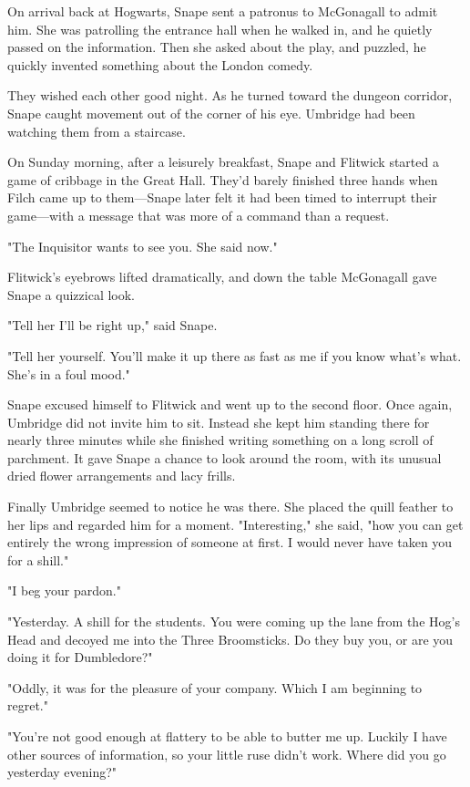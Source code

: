 On arrival back at Hogwarts, Snape sent a patronus to McGonagall to admit him. She was patrolling the entrance hall when he walked in, and he quietly passed on the information. Then she asked about the play, and puzzled, he quickly invented something about the London comedy.

They wished each other good night. As he turned toward the dungeon corridor, Snape caught movement out of the corner of his eye. Umbridge had been watching them from a staircase.

On Sunday morning, after a leisurely breakfast, Snape and Flitwick started a game of cribbage in the Great Hall. They'd barely finished three hands when Filch came up to them—Snape later felt it had been timed to interrupt their game—with a message that was more of a command than a request.

"The Inquisitor wants to see you. She said now."

Flitwick's eyebrows lifted dramatically, and down the table McGonagall gave Snape a quizzical look.

"Tell her I'll be right up," said Snape.

"Tell her yourself. You'll make it up there as fast as me if you know what's what. She's in a foul mood."

Snape excused himself to Flitwick and went up to the second floor. Once again, Umbridge did not invite him to sit. Instead she kept him standing there for nearly three minutes while she finished writing something on a long scroll of parchment. It gave Snape a chance to look around the room, with its unusual dried flower arrangements and lacy frills.

Finally Umbridge seemed to notice he was there. She placed the quill feather to her lips and regarded him for a moment. "Interesting," she said, "how you can get entirely the wrong impression of someone at first. I would never have taken you for a shill."

"I beg your pardon."

"Yesterday. A shill for the students. You were coming up the lane from the Hog's Head and decoyed me into the Three Broomsticks. Do they buy you, or are you doing it for Dumbledore?"

"Oddly, it was for the pleasure of your company. Which I am beginning to regret."

"You're not good enough at flattery to be able to butter me up. Luckily I have other sources of information, so your little ruse didn't work. Where did you go yesterday evening?"

